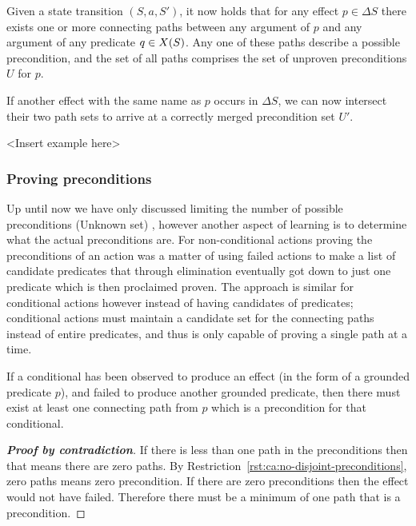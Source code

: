 \documentclass[\master/Master.tex]{subfiles}
\begin{document}
Given a state transition $\left(S, a, S'\right)$, it now holds that for any effect $p \in \Delta S$ there exists one or more connecting paths between any argument of $p$ and any argument of any predicate $q \in X(S)$. Any one of these paths describe a possible precondition, and the set of all paths comprises the set of unproven preconditions $U$ for $p$. 

If another effect with the same name as $p$ occurs in $\Delta S$, we can now intersect their two path sets to arrive at a correctly merged precondition set $U'$.

\begin{example}\label{ex:ca:non-binding-interesction-model-fixed}
    <Insert example here>
\end{example}

\subsubsection{Proving preconditions}
Up until now we have only discussed limiting the number of possible preconditions (Unknown set) , however another aspect of learning is to determine what the actual preconditions are.
For non-conditional actions proving the preconditions of an action was a matter of using failed actions to make a list of candidate predicates that through elimination eventually got down to just one predicate which is then proclaimed proven. The approach is similar for conditional actions however instead of having candidates of predicates; conditional actions must maintain a candidate set for the connecting paths instead of entire predicates, and thus is only capable of proving a single path at a time.

\begin{theorem}\label{thm:minimum-one-binding}
    If a conditional has been observed to produce an effect (in the form of a grounded predicate $p$), and failed to produce another grounded predicate, then there must exist at least one connecting path from $p$ which is a precondition for that conditional.
\end{theorem}

\begin{proof}[\textbf{Proof by contradiction}] 
    If there is less than one path in the preconditions then that means there are zero paths. By Restriction~\ref{rst:ca:no-disjoint-preconditions}, zero paths means zero precondition. If there are zero preconditions then the effect would not have failed. Therefore there must be a minimum of one path that is a precondition.
\end{proof}
\end{document}
